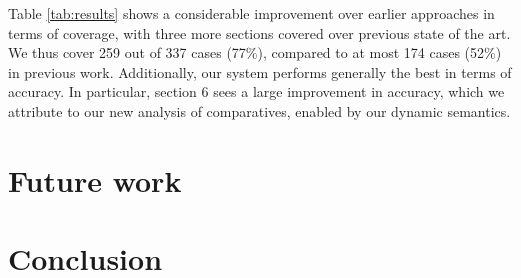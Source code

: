 \documentclass[11pt]{article}
\begin{document}
Table \ref{tab:results} shows a considerable improvement over earlier
approaches in terms of coverage, with three more sections covered over
previous state of the art. We thus cover 259 out of 337 cases (77\%),
compared to at most 174 cases (52\%) in previous work. Additionally,
our system performs generally the best in terms of accuracy. In
particular, section 6 sees a large improvement in accuracy, which we
attribute to our new analysis of comparatives, enabled by our dynamic
semantics.



\section{Future work}
\section{Conclusion}




\end{document}
